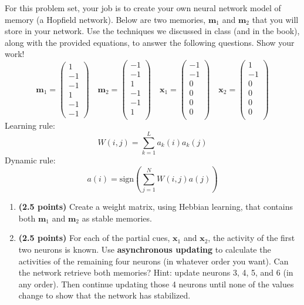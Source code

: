 \documentclass[11pt]{article}
\begin{document}
For this problem set, your job is to create your own neural
  network model of memory (a Hopfield network).  Below are two
  memories, $\mathbf{m}_1$ and $\mathbf{m}_2$ that you will store in
  your network.  Use the techniques we discussed in class (and in
  the book), along with the provided equations, to answer the
  following questions.  Show your work!
\[
  \mathbf{m}_1=
  \begin{pmatrix}
    1\\
    -1\\
    -1\\
    1\\
    -1\\
    -1
  \end{pmatrix}\quad
  \mathbf{m}_2=
  \begin{pmatrix}
    -1\\
    -1\\
    1\\
    -1\\
    -1\\
    1\\
  \end{pmatrix}\quad
\mathbf{x}_1=
  \begin{pmatrix}
    -1\\
    -1\\
    0\\
    0\\
    0\\
    0\\
  \end{pmatrix}\quad
\mathbf{x}_2=
  \begin{pmatrix}
    1\\
    -1\\
    0\\
    0\\
    0\\
    0\\
  \end{pmatrix}
\]
Learning rule:
\[
W(i,j) = \sum_{k = 1}^L a_k(i)a_k(j)
\]
Dynamic rule:
\[
a(i) = \mathrm{sign}\left(\sum_{j=1}^N W(i,j)a(j)\right)
\]

\begin{enumerate}
\item \textbf{(2.5 points)} Create a weight matrix, using Hebbian learning, that contains
  both $\mathbf{m}_1$ and $\mathbf{m}_2$ as stable memories.

\item \textbf{(2.5 points)} For each of the partial cues, $\mathbf{x}_1$ and $\mathbf{x}_2$,
  the activity of the first two neurons is known.  Use
  \textbf{asynchronous updating} to calculate the activities of the
  remaining four neurons (in whatever order you want).  Can the
  network retrieve both memories?  Hint: update neurons 3, 4, 5, and 6
  (in any order).  Then continue updating those 4 neurons until none of the
  values change to show that the network has stabilized.
\end{enumerate}
\end{document}
